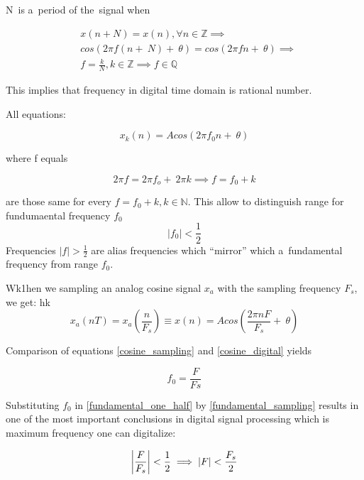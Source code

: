 \documentclass[a4paper]{report}
\theoremstyle{definition}
\DeclarePairedDelimiter{\abs}{\lvert}{\rvert}
\begin{document}
N~is a~period of the~signal when


\begin{align}
& x(n+N) = x(n), \forall n \in \mathbb{Z} \implies \\
& cos(2\pi f (n +~N) +~\theta) = cos(2\pi f n +~\theta) \implies \\
& f = \frac{k}{N}, k \in \mathbb{Z} \implies f \in \mathbb{Q}
\end{align}

This implies that frequency in digital time domain is rational number.


All equations:

\begin{equation}
x_k(n)=Acos(2\pi f_0 n +~\theta)
\label{cosine_digital}
\end{equation}

where f equals


\begin{equation}
2 \pi f = 2 \pi f_o +~2\pi k \implies f = f_0 + k
\end{equation}


are those same for every $f = f_0 + k, k \in \mathbb{N}$. This allow to distinguish range for fundumaental frequency $f_0$
\begin{equation}
|f_0| < \frac{1}{2}
\label{fundamental_one_half}
\end{equation}
Frequencies $|f| > \frac{1}{2}$ are alias frequencies which ``mirror'' which a~fundamental frequency from range $f_0$.


Wk1hen we sampling an analog cosine signal $x_a$ with the sampling frequency $F_s$, we get:
hk
\begin{equation}
x_a(nT)=x_a(\frac{n}{F_s}) \equiv x(n) = Acos(\frac{2\pi n F}{F_s} +~\theta) 
\label{cosine_sampling}
\end{equation}

Comparison of equations \ref{cosine_sampling} and \ref{cosine_digital} yields 

\begin{equation}
f_0 = \frac{F}{Fs}
\label{fundamental_sampling}
\end{equation}

Substituting $f_0$ in \ref{fundamental_one_half} by \ref{fundamental_sampling} results in one of the most important conclusions in digital signal processing which is maximum frequency one can digitalize:

\begin{equation}
	\abs*{\frac{F}{F_s}} < \frac{1}{2} \implies \abs{F} < \frac{F_s}{2}
\end{equation}
 
\end{document}
